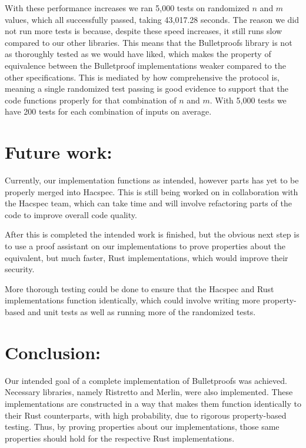 \documentclass{article}
\begin{document}
With these performance increases we ran 5,000 tests on randomized
$n$ and $m$ values, which all successfully passed, taking 43,017.28
seconds. The reason we did not run more tests is because, despite
these speed increases, it still runs slow compared to our other
libraries. This means that the Bulletproofs library is not as
thoroughly tested as we would have liked, which makes the property of 
equivalence between the Bulletproof implementations weaker compared to 
the other specifications. This is mediated by how comprehensive the 
protocol is, meaning a single randomized test passing is good evidence 
to 
support that the code functions properly for that combination of $n$
and $m$. With 5,000 tests we have 200 tests for each combination of
inputs on average.

\section{Future work:} \label{future-work}

Currently, our implementation functions as intended, however parts has
yet to be properly merged into Hacspec. This is still being worked on in
collaboration with the Hacspec team, which can take time and will
involve refactoring parts of the code to improve overall code quality.

After this is completed the intended work is finished, but the obvious
next step is to use a proof assistant on our implementations to
prove properties about the equivalent, but much faster, Rust
implementations, which would improve their security.

More thorough testing could be done to ensure that the Hacspec and
Rust implementations function identically, which could involve writing
more property-based and unit tests as well as running more of the
randomized tests.

\section{Conclusion:} \label{conclusions}

Our intended goal of a complete implementation of Bulletproofs was
achieved. Necessary libraries, namely Ristretto and Merlin, were also
implemented. These implementations are constructed in a way that
makes them function identically to their Rust counterparts, with high
probability, due to rigorous property-based testing. Thus, by proving
properties about our implementations, those same properties should hold
for the respective Rust implementations.
\end{document}
